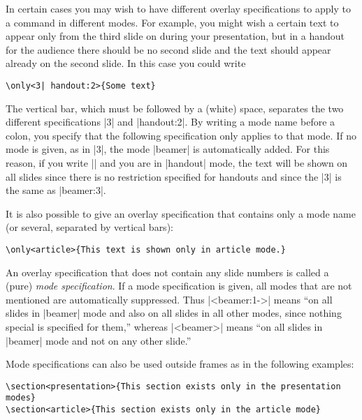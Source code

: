 In certain cases you may wish to have different overlay specifications to apply to a command in different modes. For example, you might wish a certain text to appear only from the third slide on during your presentation, but in a handout for the audience there should be no second slide and the text should appear already on the second slide. In this case you could write
\begin{verbatim}
\only<3| handout:2>{Some text}
\end{verbatim}

The vertical bar, which must be followed by a (white) space, separates the two different specifications |3| and |handout:2|. By writing a mode name before a colon, you specify that the following specification only applies to that mode. If no mode is given, as in |3|, the mode |beamer| is automatically added. For this reason, if you write || and you are in |handout| mode, the text will be shown on all slides since there is no restriction specified for handouts and since the |3| is the same as |beamer:3|.

It is also possible to give an overlay specification that contains only a mode name (or several, separated by vertical bars):
\begin{verbatim}
\only<article>{This text is shown only in article mode.}
\end{verbatim}

An overlay specification that does not contain any slide numbers is called a (pure) \emph{mode specification}. If a mode specification is given, all modes that are not mentioned are automatically suppressed. Thus |<beamer:1->| means ``on all slides in |beamer| mode and also on all slides in all other modes, since nothing special is specified for them,'' whereas |<beamer>| means ``on all slides in |beamer| mode and not on any other slide.''

Mode specifications can also be used outside frames as in the following examples:
\begin{verbatim}
\section<presentation>{This section exists only in the presentation modes}
\section<article>{This section exists only in the article mode}
\end{verbatim}

